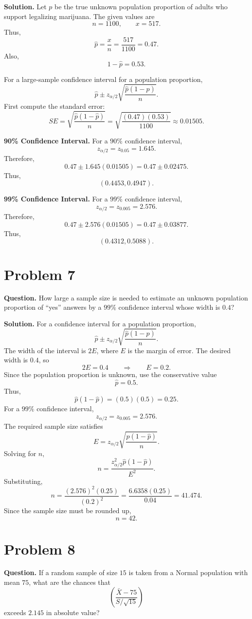 \documentclass[11pt]{article}
\begin{document}
\textbf{Solution.} Let $p$ be the true unknown population proportion of adults who support legalizing marijuana. The given values are
\[
n=1100, \qquad x=517.
\]
Thus,
\[
\hat p=\frac{x}{n}=\frac{517}{1100}=0.47.
\]
Also,
\[
1-\hat p=0.53.
\]

For a large-sample confidence interval for a population proportion,
\[
\hat p\pm z_{\alpha/2}\sqrt{\frac{\hat p(1-\hat p)}{n}}.
\]
First compute the standard error:
\[
SE=\sqrt{\frac{\hat p(1-\hat p)}{n}}=\sqrt{\frac{(0.47)(0.53)}{1100}}\approx 0.01505.
\]

\textbf{90\% Confidence Interval.} For a $90\%$ confidence interval,
\[
z_{\alpha/2}=z_{0.05}=1.645.
\]
Therefore,
\[
0.47\pm 1.645(0.01505)=0.47\pm 0.02475.
\]
Thus,
\[
\boxed{(0.4453,0.4947)}.
\]

\textbf{99\% Confidence Interval.} For a $99\%$ confidence interval,
\[
z_{\alpha/2}=z_{0.005}=2.576.
\]
Therefore,
\[
0.47\pm 2.576(0.01505)=0.47\pm 0.03877.
\]
Thus,
\[
\boxed{(0.4312,0.5088)}.
\]

\newpage
\section*{Problem 7}

\textbf{Question.} How large a sample size is needed to estimate an unknown population proportion of ``yes'' answers by a $99\%$ confidence interval whose width is $0.4$?

\textbf{Solution.} For a confidence interval for a population proportion,
\[
\hat p\pm z_{\alpha/2}\sqrt{\frac{\hat p(1-\hat p)}{n}}.
\]
The width of the interval is $2E$, where $E$ is the margin of error. The desired width is $0.4$, so
\[
2E=0.4 \qquad \Longrightarrow \qquad E=0.2.
\]
Since the population proportion is unknown, use the conservative value
\[
\hat p=0.5.
\]
Thus,
\[
\hat p(1-\hat p)=(0.5)(0.5)=0.25.
\]
For a $99\%$ confidence interval,
\[
z_{\alpha/2}=z_{0.005}=2.576.
\]
The required sample size satisfies
\[
E=z_{\alpha/2}\sqrt{\frac{\hat p(1-\hat p)}{n}}.
\]
Solving for $n$,
\[
n=\frac{z_{\alpha/2}^2\hat p(1-\hat p)}{E^2}.
\]
Substituting,
\[
n=\frac{(2.576)^2(0.25)}{(0.2)^2}=\frac{6.6358(0.25)}{0.04}=41.474.
\]
Since the sample size must be rounded up,
\[
\boxed{n=42}.
\]

\newpage
\section*{Problem 8}

\textbf{Question.} If a random sample of size $15$ is taken from a Normal population with mean $75$, what are the chances that
\[
\left(\frac{\bar X-75}{S/\sqrt{15}}\right)
\]
exceeds $2.145$ in absolute value?
\end{document}
